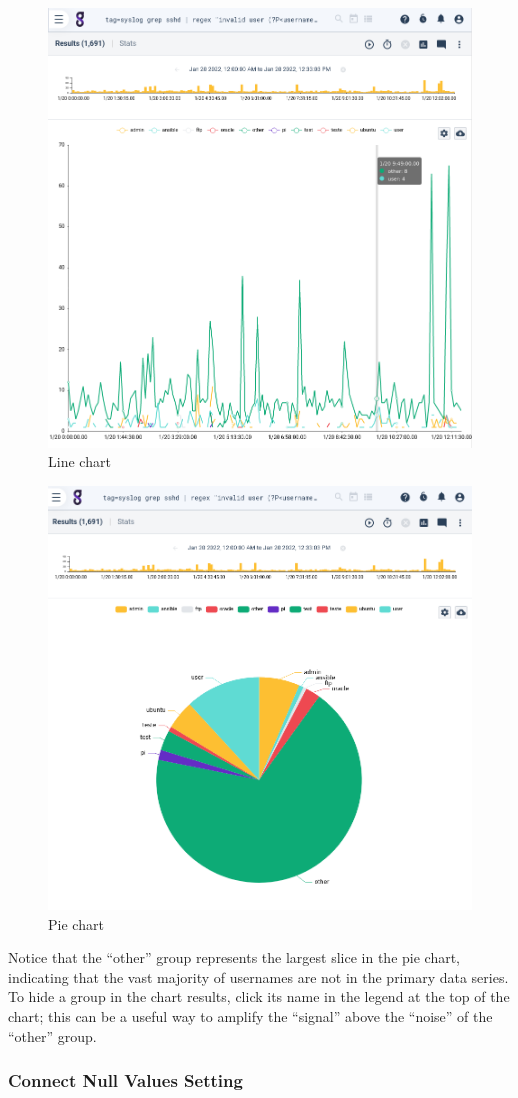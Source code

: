 \begin{figure}
	\includegraphics[width=0.6\linewidth]{images/chart-line.png}
	\caption{Line chart}
	\label{fig:chart-line}
\end{figure}

\begin{figure}
	\includegraphics[width=0.6\linewidth]{images/chart-pie.png}
	\caption{Pie chart}
	\label{fig:chart-pie}
\end{figure}

Notice that the ``other'' group represents the largest slice in the pie chart, indicating that the vast majority of usernames are not in the primary data series. To hide a group in the chart results, click its name in the legend at the top of the chart; this can be a useful way to amplify the ``signal'' above the ``noise'' of the ``other'' group.

\subsubsection{Connect Null Values Setting}

